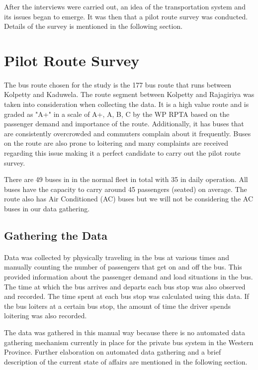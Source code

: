 After the interviews were carried out, an idea of the transportation system and its issues began to emerge. It was then that a pilot route survey was conducted. Details of the survey is mentioned in the following section.

\section{Pilot Route Survey}

\paragraph{ } The bus route chosen for the study is the 177 bus route that runs between Kolpetty and Kaduwela. The route segment between Kolpetty and Rajagiriya was taken into consideration when collecting the data. It is a high value route and is graded as "A+" in a scale of A+, A, B, C by the WP RPTA based on the passenger demand and importance of the route. Additionally, it has buses that are consistently overcrowded and commuters complain about it frequently. Buses on the route are also prone to loitering and many complaints are received regarding this issue making it a perfect candidate to carry out the pilot route survey.

There are 49 buses in in the normal fleet in total with 35 in daily operation. All buses have the capacity to carry around 45 passengers (seated) on average. The route also has Air Conditioned (AC) buses but we will not be considering the AC buses in our data gathering.

\subsection{Gathering the Data}

\paragraph{ } Data was collected by physically traveling in the bus at various times and manually counting the number of passengers that get on and off the bus. This provided information about the passenger demand and load situations in the bus. The time at which the bus arrives and departs each bus stop was also observed and recorded. The time spent at each bus stop was calculated using this data. If the bus loiters at a certain bus stop, the amount of time the driver spends loitering was also recorded.

The data was gathered in this manual way because there is no automated data gathering mechanism currently in place for the private bus system in the Western Province. Further elaboration on automated data gathering and a brief description of the current state of affairs are mentioned in the following section.

